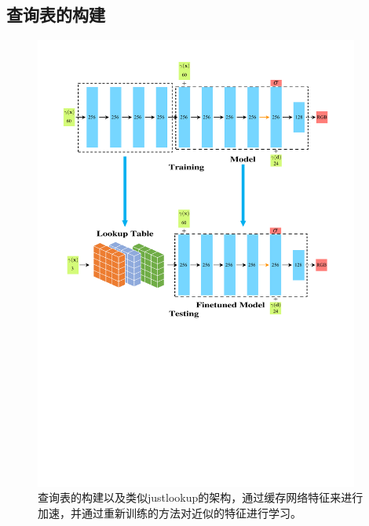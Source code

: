 
\subsection{查询表的构建}
\begin{figure}[t]
    \centering
    \includegraphics[width=0.95\textwidth]{figures/lookuptable.pdf}
    \caption{查询表的构建以及类似justlookup\cite{lin2019justlookup}的架构，通过缓存网络特征来进行加速，并通过重新训练的方法对近似的特征进行学习。}
    \label{fig:lookuptable}
\end{figure}

